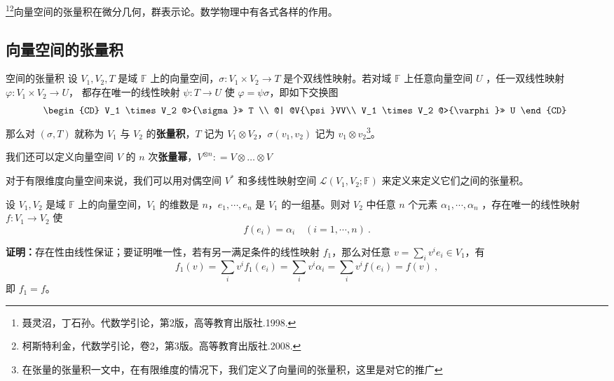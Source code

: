 
\begin{issues}
\end{issues}


\footnote{聂灵沼，丁石孙。代数学引论，第2版，高等教育出版社.1998.}\footnote{柯斯特利金，代数学引论，卷2，第3版。高等教育出版社.2008.}向量空间的张量积在微分几何，群表示论。数学物理中有各式各样的作用。

\subsection{向量空间的张量积}
\begin{definition}{空间的张量积}\label{def_TPofSp_1}
设 $V_1, V_2,T$ 是域 $\mathbb F$ 上的向量空间，$\sigma: V_1 \times V_2 \rightarrow T$ 是个双线性映射。若对域 $\mathbb F$ 上任意向量空间 $U$ ，任一双线性映射 $\varphi:V_1\times V_2\rightarrow U$， 都存在唯一的线性映射 $\psi:T\rightarrow U$ 使 $\varphi=\psi\sigma$，即如下交换图
\begin{equation}
\begin{CD}
V_1 \times V_2 @>{\sigma}>> T \\
@| @V{\psi}VV\\
V_1 \times V_2 @>{\varphi}>> U
\end{CD}~
\end{equation}
那么对 $(\sigma, T)$ 就称为 $V_1$ 与 $V_2$ 的\textbf{张量积}，$T$ 记为 $V_1 \otimes V_2$，$\sigma(v_1, v_2)$ 记为 $v_1 \otimes v_2$\footnote{在张量的张量积一文中，在有限维度的情况下，我们定义了向量间的张量积，这里是对它的推广}。

我们还可以定义向量空间 $V$ 的 $n$ 次\textbf{张量幂}，$V^{\otimes n}: = V \otimes \dots \otimes V$
\end{definition}

对于有限维度向量空间来说，我们可以用对偶空间 $V^*$ 和多线性映射空间 $\mathcal L(V_1,V_2;\mathbb F)$ 来定义来定义它们之间的张量积。

\begin{lemma}{}\label{lem_TPofSp_2}
设 $V_1,V_2$ 是域 $\mathbb F$ 上的向量空间，$V_1$ 的维数是 $n$，$e_1,\cdots,e_n$ 是 $V_1$ 的一组基。则对 $V_2$ 中任意 $n$ 个元素 $\alpha_1,\cdots,\alpha_n$ ，存在唯一的线性映射 $f:V_1\rightarrow V_2$ 使
\begin{equation}
f(e_i)=\alpha_i\quad (i=1,\cdots,n)~.
\end{equation}
\end{lemma}
\textbf{证明：}存在性由线性保证；要证明唯一性，若有另一满足条件的线性映射 $f_1$，那么对任意 $v=\sum\limits_{i}v^ie_i\in V_1$，有
\begin{equation}
f_1(v)=\sum_{i}v^if_1(e_i)=\sum_{i}v^i\alpha_i=\sum_{i}v^if(e_i)=f(v)~,
\end{equation}
即 $f_1=f$。

